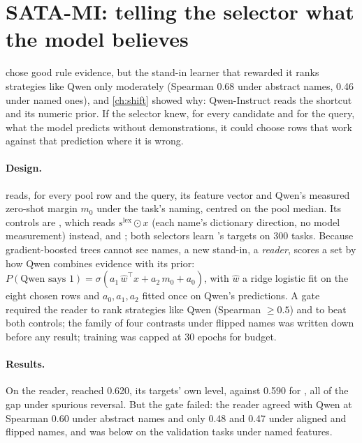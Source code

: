 
\section{SATA-MI: telling the selector what the model believes}
\label{sec:satami}

\sata chose good rule evidence, but the stand-in learner that rewarded it ranks strategies like Qwen only moderately (Spearman 0.68 under abstract names, 0.46 under named ones), and \autoref{ch:shift} showed why: Qwen-Instruct reads the shortcut and its numeric prior.
If the selector knew, for every candidate and for the query, what the model predicts without demonstrations, it could choose rows that work against that prediction where it is wrong.

\paragraph{Design.}
\satami reads, for every pool row and the query, its feature vector and Qwen's measured zero-shot margin $m_0$ under the task's naming, centred on the pool median.
Its controls are , which reads $s^{\mathrm{lex}} \odot x$ (each name's dictionary direction, no model measurement) instead, and ; both selectors learn \sata's targets on 300 tasks.
Because gradient-boosted trees cannot see names, a new stand-in, a \emph{reader}, scores a set by how Qwen combines evidence with its prior: $P(\text{Qwen says }1) = \sigma(a_1\, \hat w^\top x + a_2\, m_0 + a_0)$, with $\hat w$ a ridge logistic fit on the eight chosen rows and $a_0, a_1, a_2$ fitted once on Qwen's predictions.
A gate required the reader to rank strategies like Qwen (Spearman $\ge 0.5$) and \satami to beat both controls; the family of four contrasts under flipped names was written down before any result; training was capped at 30 epochs for budget.

\paragraph{Results.}
On the reader, \satami reached 0.620, its targets' own level, against 0.590 for , all of the gap under spurious reversal.
But the gate failed: the reader agreed with Qwen at Spearman 0.60 under abstract names and only 0.48 and 0.47 under aligned and flipped names, and \satami was below  on the validation tasks under named features.

